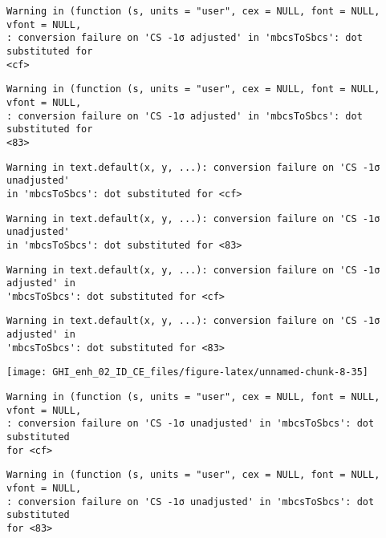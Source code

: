 \documentclass[
  10pt,
  a4paper,oneside]{article}
\begin{document}
\begin{verbatim}
Warning in (function (s, units = "user", cex = NULL, font = NULL, vfont = NULL,
: conversion failure on 'CS -1σ adjusted' in 'mbcsToSbcs': dot substituted for
<cf>
\end{verbatim}

\begin{verbatim}
Warning in (function (s, units = "user", cex = NULL, font = NULL, vfont = NULL,
: conversion failure on 'CS -1σ adjusted' in 'mbcsToSbcs': dot substituted for
<83>
\end{verbatim}

\begin{verbatim}
Warning in text.default(x, y, ...): conversion failure on 'CS -1σ unadjusted'
in 'mbcsToSbcs': dot substituted for <cf>
\end{verbatim}

\begin{verbatim}
Warning in text.default(x, y, ...): conversion failure on 'CS -1σ unadjusted'
in 'mbcsToSbcs': dot substituted for <83>
\end{verbatim}

\begin{verbatim}
Warning in text.default(x, y, ...): conversion failure on 'CS -1σ adjusted' in
'mbcsToSbcs': dot substituted for <cf>
\end{verbatim}

\begin{verbatim}
Warning in text.default(x, y, ...): conversion failure on 'CS -1σ adjusted' in
'mbcsToSbcs': dot substituted for <83>
\end{verbatim}

\begin{center}\texttt{[image: GHI\_enh\_02\_ID\_CE\_files/figure-latex/unnamed-chunk-8-35]} \end{center}

\begin{verbatim}
Warning in (function (s, units = "user", cex = NULL, font = NULL, vfont = NULL,
: conversion failure on 'CS -1σ unadjusted' in 'mbcsToSbcs': dot substituted
for <cf>
\end{verbatim}

\begin{verbatim}
Warning in (function (s, units = "user", cex = NULL, font = NULL, vfont = NULL,
: conversion failure on 'CS -1σ unadjusted' in 'mbcsToSbcs': dot substituted
for <83>
\end{verbatim}
\end{document}
